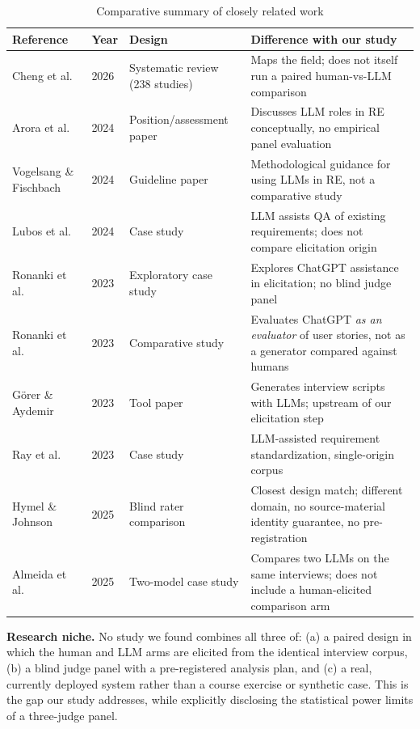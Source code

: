 \documentclass{llncs}
\begin{document}
\begin{table}[htbp]
\centering
\caption{Comparative summary of closely related work}
\label{tab:relwork}
\small
\begin{tabular}{p{2.3cm}p{0.75cm}p{2.3cm}p{4.35cm}}
\toprule
Reference & Year & Design & Difference with our study \\
\midrule
Cheng et al.~\cite{cheng2026genai} & 2026 & Systematic review (238 studies) & Maps the field; does not itself run a paired human-vs-LLM comparison \\
Arora et al.~\cite{arora2024advancing} & 2024 & Position/\allowbreak assessment paper & Discusses LLM roles in RE conceptually, no empirical panel evaluation \\
Vogelsang \& Fischbach~\cite{vogelsang2024using} & 2024 & Guideline paper & Methodological guidance for using LLMs in RE, not a comparative study \\
Lubos et al.~\cite{lubos2024leveraging} & 2024 & Case study & LLM assists QA of existing requirements; does not compare elicitation origin \\
Ronanki et al.~\cite{ronanki2023investigating} & 2023 & Exploratory case study & Explores ChatGPT assistance in elicitation; no blind judge panel \\
Ronanki et al.~\cite{ronanki2023chatgpt} & 2023 & Comparative study & Evaluates ChatGPT \emph{as an evaluator} of user stories, not as a generator compared against humans \\
G\"orer \& Aydemir~\cite{gorer2023generating} & 2023 & Tool paper & Generates interview scripts with LLMs; upstream of our elicitation step \\
Ray et al.~\cite{ray2023agile} & 2023 & Case study & LLM-assisted requirement standardization, single-origin corpus \\
Hymel \& Johnson~\cite{hymel2025analysis} & 2025 & Blind rater comparison & Closest design match; different domain, no source-material identity guarantee, no pre-registration \\
Almeida et al.~\cite{almeida2025elicitation} & 2025 & Two-model case study & Compares two LLMs on the same interviews; does not include a human-elicited comparison arm \\
\bottomrule
\end{tabular}
\end{table}

\textbf{Research niche.} No study we found combines all three of: (a) a paired design in
which the human and LLM arms are elicited from the identical interview corpus, (b) a
blind judge panel with a pre-registered analysis plan, and (c) a real, currently
deployed system rather than a course exercise or synthetic case. This is the gap our
study addresses, while explicitly disclosing the statistical power limits of a
three-judge panel.
\end{document}
